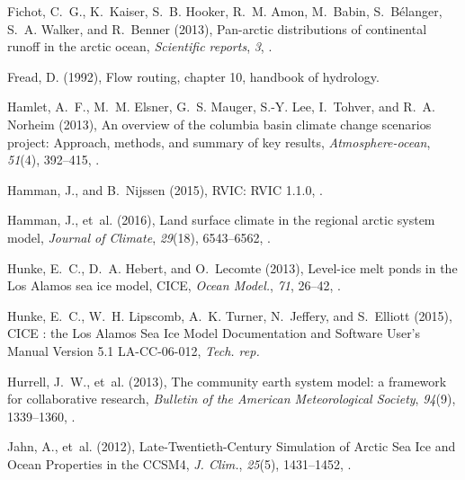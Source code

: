 \documentclass[jgrga, draft]{agutex}
\begin{document}
\begin{article}
\begin{thebibliography}{79}
Fichot, C.~G., K.~Kaiser, S.~B. Hooker, R.~M. Amon, M.~Babin, S.~B{\'e}langer,
  S.~A. Walker, and R.~Benner (2013), Pan-arctic distributions of continental
  runoff in the arctic ocean, \textit{Scientific reports}, \textit{3},
  .

Fread, D. (1992), Flow routing, chapter 10, handbook of hydrology.

Hamlet, A.~F., M.~M. Elsner, G.~S. Mauger, S.-Y. Lee, I.~Tohver, and R.~A.
  Norheim (2013), An overview of the columbia basin climate change scenarios
  project: Approach, methods, and summary of key results,
  \textit{Atmosphere-ocean}, \textit{51}(4), 392--415,
  .

Hamman, J., and B.~Nijssen (2015), {RVIC: RVIC 1.1.0},
  .

Hamman, J., et~al. (2016), Land surface climate in the regional arctic system
  model, \textit{Journal of Climate}, \textit{29}(18), 6543–6562,
  .

Hunke, E.~C., D.~A. Hebert, and O.~Lecomte (2013), {Level-ice melt ponds in the
  Los Alamos sea ice model, CICE}, \textit{Ocean Model.}, \textit{71}, 26--42,
  .

Hunke, E.~C., W.~H. Lipscomb, A.~K. Turner, N.~Jeffery, and S.~Elliott (2015),
  {CICE : the Los Alamos Sea Ice Model Documentation and Software User's Manual
  Version 5.1 LA-CC-06-012}, \textit{Tech. rep.}

Hurrell, J.~W., et~al. (2013), The community earth system model: a framework
  for collaborative research, \textit{Bulletin of the American Meteorological
  Society}, \textit{94}(9), 1339--1360, .

Jahn, A., et~al. (2012), {Late-Twentieth-Century Simulation of Arctic Sea Ice
  and Ocean Properties in the CCSM4}, \textit{J. Clim.}, \textit{25}(5),
  1431--1452, .


\end{thebibliography}
\end{article}
\end{document}
